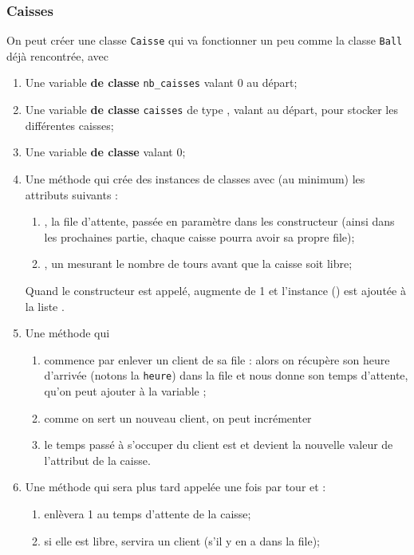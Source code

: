 \documentclass[a4paper,12pt,french]{book}
\begin{document}
\subsubsection*{Caisses}
On peut créer une classe \texttt{Caisse} qui va fonctionner un peu comme la classe \texttt{Ball} déjà rencontrée, avec
\begin{enumerate}[--]
	\item Une variable \textbf{de classe} \texttt{nb\_caisses} valant 0 au départ;
    \item Une variable \textbf{de classe} \texttt{caisses} de type , valant \pythoninline{[]} au départ, pour stocker les différentes caisses;
    \item Une variable \textbf{de classe}  valant 0;
    \item Une méthode  qui crée des instances de classes avec (au minimum) les attributs suivants :
    \begin{enumerate}[--]
    	\item {}, la file d'attente, passée en paramètre dans les constructeur (ainsi dans les prochaines partie, chaque caisse pourra avoir sa propre file);
        \item {}, un  mesurant le nombre de tours avant que la caisse soit libre;
    \end{enumerate}
    Quand le constructeur est appelé,  augmente de 1 et l'instance () est ajoutée à la liste .
    \item Une méthode  qui
    \begin{enumerate}[--]
    	\item commence par enlever un client de sa file : alors on récupère son heure d'arrivée (notons la \texttt{heure}) dans la file et  nous donne son temps d'attente, qu'on peut ajouter à la variable ;
        \item  comme on sert un nouveau client, on peut incrémenter 
        \item  le temps passé à s'occuper du client est  et devient la nouvelle valeur de l'attribut  de la caisse.
    \end{enumerate}
    \item Une méthode  qui sera plus tard appelée une fois par tour et :
        \begin{enumerate}[--]
        	\item enlèvera 1 au temps d'attente de la caisse;
            \item si elle est libre, servira un client (s'il y en a dans la file);
        \end{enumerate}

\end{enumerate}
\end{document}
